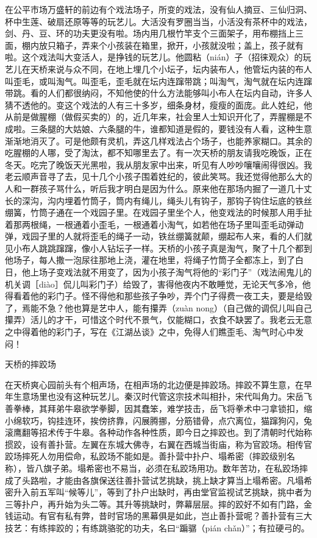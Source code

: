 \documentclass[12pt,UTF8]{ctexbook}
\begin{document}
在公平市场万盛轩的前边有个戏法场子，所变的戏法，没有仙人摘豆、三仙归洞、杯中生莲、破扇还原等等的玩艺儿。大活没有罗圈当当，小活没有茶杯中的戏法，剑、丹、豆、环的功夫更没有啦。场内用几根竹竿支个三面架子，用布棚挡上三面，棚内放只箱子，弄来个小孩装在箱里，掀开，小孩就没啦；盖上，孩子就有啦。这个戏法叫大变活人，是挣钱的玩艺儿。他圆粘（nián）子（招徕观众）的玩艺儿在天桥来说与众不同，在地上埋几个小坛子，坛内装布人，他管坛内装的布人叫歪毛，或叫淘气。叫歪毛，歪毛就在坛内连蹿带跳；叫淘气，淘气就在坛内连蹿带跳。看的人们都很纳闷，不知他使的什么方法能够叫小布人在坛内自动，许多人猜不透他的。变这个戏法的人有三十多岁，细条身材，瘦瘦的面庞。此人姓纪，他从前是做腥棚（做假买卖的）的，近几年来，社会里人士知识开化了，弄腥棚是不成啦。三条腿的大姑娘、六条腿的牛，谁都知道是假的，要钱没有人看，这种生意渐渐地消灭了。可是他颇有灵机，弄这几样戏法占个场子，也能养家糊口。其余的吃腥棚的人哪，受了淘汰，都不知哪里去了。有一次天桥的朋友请我吃晚饭，正在冬天。吃完了晚饭天光黑啦，我从朋友家中出来，听见有人吵吵嚷嚷闹得很凶。我老云顺声音寻了去，见十几个小孩子围着姓纪的，彼此笑骂。我还觉得他那么大的人和一群孩子骂什么，听后我才明白是因为什么。原来他在那场内掘了一道几十丈长的深沟，沟内埋着竹筒子，筒内有绳儿，绳头儿有钩子，那钩子钩住坛底的铁丝绷簧，竹筒子通在一个戏园子里。在戏园子里坐个人，他变戏法的时候那人用手扯着那两根绳，一根通着小歪毛，一根通着小淘气，如若他在场子里叫歪毛动弹动弹，戏园子里的人就将歪毛的绳子一动，铁丝绷簧就颠，绷起布人来，看的人们就见小布人跳跳蹿蹿，像小人钻坛子一样。天桥的小孩子真是淘气，聚了十几个都到他场子，每人撒一泡尿往那地上浇，灌在地里，将绳子竹筒子全都冻上，到了白日，他上场子变戏法就不用变了，因为小孩子淘气将他的“彩门子”（戏法闹鬼儿的机关调［diào］侃儿叫彩门子）给毁了，害得他夜内不敢睡觉，无论天气多冷，他得看着他的彩门子。怪不得他和那些孩子争吵，弄个门子得费一夜工夫，要是给毁了，焉能不急？他也算是艺中人，能有攥弄（zuàn nong）（自己做的调侃儿叫自己攥弄）活儿的才干，可惜这个时代不景气，仅能糊口，衣食不缺罢了。我老云无意之中得着他的彩门子，写在《江湖丛谈》之中，免得人们瞧歪毛、淘气时心中发闷！





天桥的摔跤场


在天桥爽心园前头有个相声场，在相声场的北边便是摔跤场。摔跤不算生意，在早年生意场里也没有这种玩艺儿。秦汉时代管这宗技术叫相扑，宋代叫角力。宋岳飞善拳棒，其拜弟牛皋欲学拳脚，因其蠢笨，难学技击，岳飞将拳术中刁拿锁扣，缩小绵软巧，钩挂连环，挨傍挤靠，闪展腾挪，分筋错骨，点穴离位，猫蹿狗闪，兔滚鹰翻等招术传于牛皋。各种动作各种性质，即今日之摔跤也。到了清朝时代始称掼跤，设有善扑营。左翼在东城大佛寺，右翼在西城当街庙，称为官跤场。相传官跤场摔死人勿用偿命，私跤场不能如是。善扑营中扑户、塌希密（摔跤级别名称），皆八旗子弟。塌希密也不易当，必须在私跤场用功。数年苦功，在私跤场摔成了头路啦，才能由各旗保送往善扑营试艺挑缺，挑上缺才算当上塌希密。凡塌希密升入前五军叫“候等儿”，等到了扑户出缺时，再由堂官监视试艺挑缺，挑中者为三等扑户，再升始为头二等。其升等挑缺时，弊幕层层。摔的跤好不如有门路，金钱运动。有官有私有弊，昔时官场的黑幕俱是如此，岂止善扑营呢？善扑营有三大技艺：有练摔跤的；有练跳骆驼的功夫，名曰“蹁骣（pián chǎn）”；有拉硬弓的。
\end{document}
